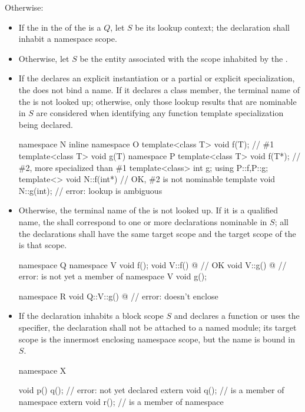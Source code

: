 \pnum
Otherwise:
\begin{itemize}
\item
If the  in
the  of the  is
a  $Q$,
let $S$ be its lookup context;
the declaration shall inhabit a namespace scope.
\item
Otherwise, let $S$ be the entity associated with the scope inhabited by
the .
\item
If the  declares
an explicit instantiation or a partial or explicit specialization,
the  does not bind a name.
If it declares a class member,
the terminal name of the  is not looked up;
otherwise, only those lookup results that are nominable in $S$
are considered when identifying
any function template specialization being declared.
\begin{example}
\begin{codeblock}
namespace N {
  inline namespace O {
    template<class T> void f(T);        // \#1
    template<class T> void g(T) {}
  }
  namespace P {
    template<class T> void f(T*);       // \#2, more specialized than \#1
    template<class> int g;
  }
  using P::f,P::g;
}
template<> void N::f(int*) {}           // OK, \#2 is not nominable
template void N::g(int);                // error: lookup is ambiguous
\end{codeblock}
\end{example}
\item
Otherwise,
the terminal name of the  is not looked up.
If it is a qualified name,
the  shall correspond to
one or more declarations nominable in $S$;
all the declarations shall have the same target scope and
the target scope of the  is that scope.
\begin{example}
\begin{codeblock}
namespace Q {
  namespace V {
    void f();
  }
  void V::f() { @\commentellip@ }     // OK
  void V::g() { @\commentellip@ }     // error:  is not yet a member of 
  namespace V {
    void g();
  }
}

namespace R {
  void Q::V::g() { @\commentellip@ }  // error:  doesn't enclose 
}
\end{codeblock}
\end{example}
\item
If the declaration inhabits a block scope $S$ and
declares a function or uses the  specifier,
the declaration shall not be attached to a named module;
its target scope is the innermost enclosing namespace scope,
but the name is bound in $S$.
\begin{example}
\begin{codeblock}
namespace X {
  void p() {
    q();                        // error:  not yet declared
    extern void q();            //  is a member of namespace 
    extern void r();            //  is a member of namespace 
  }

}
\end{codeblock}
\end{example}
\end{itemize}
